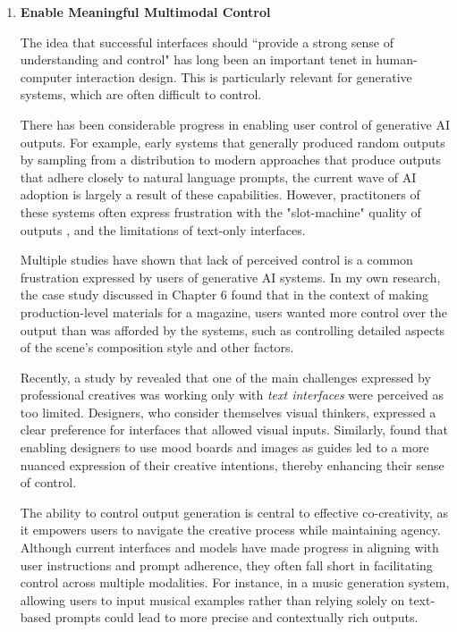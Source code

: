 \begin{enumerate}

\item \textbf{Enable Meaningful Multimodal Control}

The idea that successful  interfaces  should  “provide  a  strong  sense  of  understanding  and  control" \cite{Donald1986-hx} has long been an important tenet in human-computer interaction design. This is particularly relevant for generative systems, which are often difficult to control. 

There has been considerable progress in enabling user control of generative AI outputs. For example, early systems that generally produced random outputs by sampling from a distribution \cite{Goodfellow2016-su} to modern approaches that produce outputs that adhere closely to natural language prompts, the current wave of AI adoption is largely a result of these capabilities. However, practitoners of these systems often express frustration with the "slot-machine" quality of outputs \cite{Nebelong2023-rb}, and the limitations of text-only interfaces. 

Multiple studies have shown that lack of perceived control is a common frustration expressed by users of generative AI systems. 
In my own research, the case study discussed in Chapter 6 \cite{Ocampo2024-dv} found that in the context of making production-level materials for a magazine, users wanted more control over the output than was afforded by the systems, such as controlling detailed aspects of the scene's composition style and other factors. 

Recently, a study by \cite{Park2024-gw} revealed that one of the main challenges expressed by professional creatives was working only with \textit{text interfaces} were perceived as too limited. Designers, who consider themselves visual thinkers, expressed a clear preference for interfaces that allowed visual inputs. Similarly, \cite{Peng2024-tr} found that enabling designers to use mood boards and images as guides led to a more nuanced expression of their creative intentions, thereby enhancing their sense of control. 

The ability to control output generation is central to effective co-creativity, as it empowers users to navigate the creative process while maintaining agency. Although current interfaces and models have made progress in aligning with user instructions and prompt adherence, they often fall short in facilitating control across multiple modalities. For instance, in a music generation system, allowing users to input musical examples rather than relying solely on text-based prompts could lead to more precise and contextually rich outputs.


\end{enumerate}
